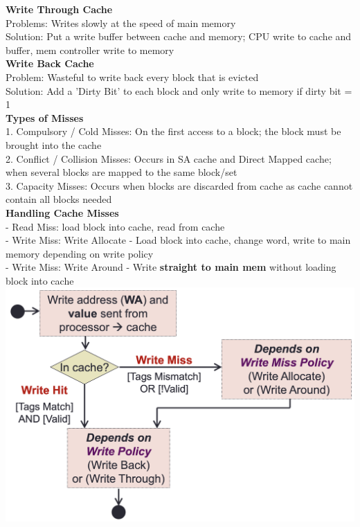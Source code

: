 \documentclass[10pt, a4paper]{article}
\newcommand{\highlight}[1]{{\color{red}\textbf{#1}}}
\newcommand{\blue}[1]{{\color{MidnightBlue}#1}}
\newcommand{\red}[1]{{\color{red}#1}}
\newcommand{\green}[1]{{\color{ForestGreen}#1}}
\begin{document}
\begin{multicols*}{3}
		\textbf{Write Through Cache}\\
		\red{Problems}: Writes slowly at the speed of main memory\\
		\green{Solution}: Put a write buffer between cache and memory; CPU write to cache and buffer, mem controller write to memory\\
		\textbf{Write Back Cache}\\
		\red{Problem}: Wasteful to write back every block that is evicted\\
		\green{Solution}: Add a 'Dirty Bit' to each block and only write to memory if dirty bit = 1\\

		\textbf{Types of Misses}\\
		1. \blue{Compulsory / Cold Misses}: On the first access to a block; the block must be brought into the cache\\
		2. \blue{Conflict / Collision Misses}: Occurs in SA cache and Direct Mapped cache; when several blocks are mapped to the same block/set\\
		3. \blue{Capacity Misses}: Occurs when blocks are discarded from cache as cache cannot contain all blocks needed\\
		\textbf{Handling Cache Misses}\\
		- \blue{Read Miss}: load block into cache, read from cache\\
		- \blue{Write Miss}: Write Allocate - Load block into cache, change word, write to main memory depending on write policy\\
		- \blue{Write Miss}: Write Around - Write \highlight{straight to main mem} without loading block into cache\\
		\includegraphics[scale=.22]{./assets/writeDataCache}


\end{multicols*}
\end{document}

